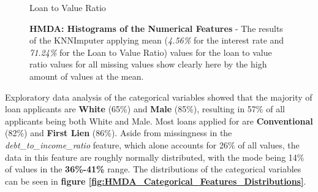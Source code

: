 \begin{figure}[!htbp]
\begin{minipage}{0.5\textwidth}
        \small
        Loan to Value Ratio
    \end{minipage}    
    \caption[HMDA: Histograms of the Numerical Features]{\textbf{HMDA: Histograms of the Numerical Features} - The results of the KNNImputer applying mean (\textit{4.56\%} for the interest rate and \textit{71.24\%} for the Loan to Value Ratio) values for the loan to value ratio values for all missing values show clearly here by the high amount of values at the mean.}
    \label{fig:CHXX_Numerical_Distributions_2}
\end{figure}

Exploratory data analysis of the categorical variables showed that the majority of loan applicants are \textbf{White} (65\%) and \textbf{Male} (85\%), resulting in 57\% of all applicants being both White and Male.
Most loans applied for are \textbf{Conventional} (82\%) and \textbf{First Lien} (86\%).
Aside from missingness in the \textit{debt\_to\_income\_ratio} feature, which alone accounts for 26\% of all values, the data in this feature are roughly normally distributed, with the mode being 14\% of values in the \textbf{36\%-41\%} range. 
The distributions of the categorical variables can be seen in \textbf{figure \ref{fig:HMDA_Categorical_Features_Distributions}}.

    


